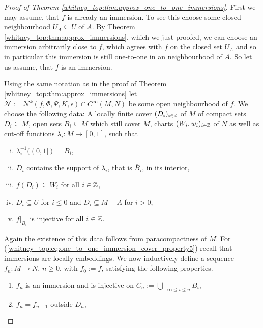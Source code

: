\begin{proof}[Proof of Theorem \ref{whitney_top:thm:approx_one_to_one_immersions}]
    First we may assume, that $f$ is already an immersion. To see this choose some closed neighbourhood $U_A \subseteq U$ of $A$. By Theorem \ref{whitney_top:thm:approx_immersions}, which we just proofed, we can choose an immersion arbitrarily close to $f$, which agrees with $f$ on the closed set $U_A$ and so in particular this immersion is still one-to-one in an neighbourhood of $A$. So let us assume, that $f$ is an immersion. 
    
    Using the same notation as in the proof of Theorem \ref{whitney_top:thm:approx_immersions} let $\mathcal{N} := \mathcal{N}^k(f,\Phi,\Psi,K,\epsilon) \cap C^\infty(M,N)$ be some open neighbourhood of $f$. We choose the following data: A locally finite cover $(D_i)_{i \in \mathbb{Z}}$ of $M$ of compact sets $D_i \subseteq M$, open sets $B_i \subseteq M$ which still cover $M$, charts $(W_i,w_i)_{i \in \mathbb{Z}}$ of $N$ as well as cut-off functions $\lambda_i \colon M \to [0,1]$, such that 
    \begin{enumerate}[(i)]
        \item \label{whitney_top:eq:one_to_one_immersion_cover_property1} $\lambda_i^{-1}((0,1]) = B_i$,
        \item \label{whitney_top:eq:one_to_one_immersion_cover_property2}$D_i$ contains the support of $\lambda_i$, that is $\overline{B}_i$, in its interior,
        \item $f(D_i) \subseteq W_i$ for all $i \in \mathbb{Z}$,
        \item \label{whitney_top:eq:one_to_one_immersion_cover_property4}$D_i \subseteq U$ for $i \leq 0$ and $D_i \subseteq M - A$ for $i >0$,
        \item \label{whitney_top:eq:one_to_one_immersion_cover_property5}$f|_{B_i}$ is injective for all $i \in \mathbb{Z}$.
    \end{enumerate}
    Again the existence of this data follows from paracompactness of $M$. For (\ref{whitney_top:eq:one_to_one_immersion_cover_property5}) recall that immersions are locally embeddings. We now inductively define a sequence $f_n \colon M \to N$, $n \geq 0$, with $f_0 := f$, satisfying the following properties.
    \begin{enumerate}[1)]
        \item \label{whitney_top:eq:one_to_one_immersion_property_1} $f_n$ is an immersion and is injective on $C_n := \bigcup_{-\infty \leq i \leq n} B_i$,
        \item \label{whitney_top:eq:one_to_one_immersion_property_2} $f_n = f_{n-1}$ outside $D_n$,

\end{enumerate}
\end{proof}
